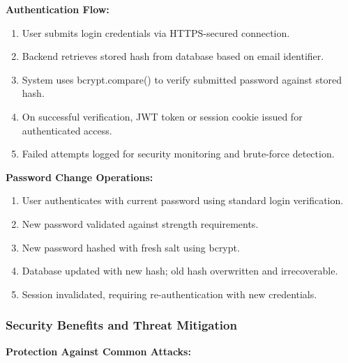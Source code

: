 \documentclass[12pt,a4paper]{article}
\begin{document}
\vspace{0.5em}

\textbf{Authentication Flow:}

\begin{enumerate}[leftmargin=2em, itemsep=6pt]
    \item User submits login credentials via HTTPS-secured connection.
    \item Backend retrieves stored hash from database based on email identifier.
    \item System uses bcrypt.compare() to verify submitted password against stored hash.
    \item On successful verification, JWT token or session cookie issued for authenticated access.
    \item Failed attempts logged for security monitoring and brute-force detection.
\end{enumerate}

\vspace{0.5em}

\textbf{Password Change Operations:}

\begin{enumerate}[leftmargin=2em, itemsep=6pt]
    \item User authenticates with current password using standard login verification.
    \item New password validated against strength requirements.
    \item New password hashed with fresh salt using bcrypt.
    \item Database updated with new hash; old hash overwritten and irrecoverable.
    \item Session invalidated, requiring re-authentication with new credentials.
\end{enumerate}

\subsubsection{Security Benefits and Threat Mitigation}

\textbf{Protection Against Common Attacks:}
\end{document}
